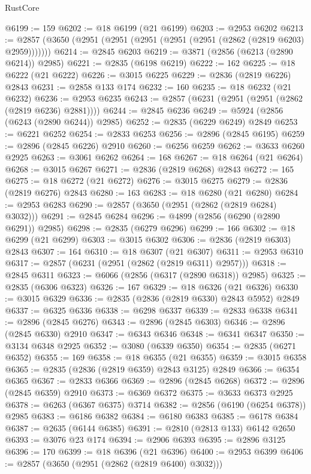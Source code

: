 \begin{lexlean}{RustCore}
\begin{coremodule}
@6199 := 159
@6202 := @18 @6199 (@21 @6199)
@6203 := @2953 @6202
@6213 := @2857 (@3650 (@2951 (@2951 (@2951 (@2951 (@2951 (@2862 (@2819 @6203) @2959)))))))
@6214 := @2845 @6203
@6219 := @3871 (@2856 (@6213 (@2890 @6214)) @2985)
@6221 := @2835 (@6198 @6219)
@6222 := 162
@6225 := @18 @6222 (@21 @6222)
@6226 := @3015 @6225
@6229 := @2836 (@2819 @6226) @2843
@6231 := @2858 @133 @174
@6232 := 160
@6235 := @18 @6232 (@21 @6232)
@6236 := @2953 @6235
@6243 := @2857 (@6231 (@2951 (@2951 (@2862 (@2819 @6236) @2881))))
@6244 := @2845 @6236
@6249 := @5924 (@2856 (@6243 (@2890 @6244)) @2985)
@6252 := @2835 (@6229 @6249) @2849
@6253 := @6221 @6252
@6254 := @2833 @6253
@6256 := @2896 (@2845 @6195)
@6259 := @2896 (@2845 @6226) @2910
@6260 := @6256 @6259
@6262 := @3633 @6260 @2925
@6263 := @3061 @6262
@6264 := 168
@6267 := @18 @6264 (@21 @6264)
@6268 := @3015 @6267
@6271 := @2836 (@2819 @6268) @2843
@6272 := 165
@6275 := @18 @6272 (@21 @6272)
@6276 := @3015 @6275
@6279 := @2836 (@2819 @6276) @2843
@6280 := 163
@6283 := @18 @6280 (@21 @6280)
@6284 := @2953 @6283
@6290 := @2857 (@3650 (@2951 (@2862 (@2819 @6284) @3032)))
@6291 := @2845 @6284
@6296 := @4899 (@2856 (@6290 (@2890 @6291)) @2985)
@6298 := @2835 (@6279 @6296)
@6299 := 166
@6302 := @18 @6299 (@21 @6299)
@6303 := @3015 @6302
@6306 := @2836 (@2819 @6303) @2843
@6307 := 164
@6310 := @18 @6307 (@21 @6307)
@6311 := @2953 @6310
@6317 := @2857 (@6231 (@2951 (@2862 (@2819 @6311) @2957)))
@6318 := @2845 @6311
@6323 := @6066 (@2856 (@6317 (@2890 @6318)) @2985)
@6325 := @2835 (@6306 @6323)
@6326 := 167
@6329 := @18 @6326 (@21 @6326)
@6330 := @3015 @6329
@6336 := @2835 (@2836 (@2819 @6330) @2843 @5952) @2849
@6337 := @6325 @6336
@6338 := @6298 @6337
@6339 := @2833 @6338
@6341 := @2896 (@2845 @6276)
@6343 := @2896 (@2845 @6303)
@6346 := @2896 (@2845 @6330) @2910
@6347 := @6343 @6346
@6348 := @6341 @6347
@6350 := @3134 @6348 @2925
@6352 := @3080 (@6339 @6350)
@6354 := @2835 (@6271 @6352)
@6355 := 169
@6358 := @18 @6355 (@21 @6355)
@6359 := @3015 @6358
@6365 := @2835 (@2836 (@2819 @6359) @2843 @3125) @2849
@6366 := @6354 @6365
@6367 := @2833 @6366
@6369 := @2896 (@2845 @6268)
@6372 := @2896 (@2845 @6359) @2910
@6373 := @6369 @6372
@6375 := @3633 @6373 @2925
@6378 := @6263 (@6367 @6375) @3714
@6382 := @2856 (@6190 (@6254 @6378)) @2985
@6383 := @6186 @6382
@6384 := @6180 @6383
@6385 := @6178 @6384
@6387 := @2635 (@6144 @6385)
@6391 := @2810 (@2813 @133) @6142 @2650
@6393 := @3076 @23 @174
@6394 := @2906 @6393
@6395 := @2896 @3125
@6396 := 170
@6399 := @18 @6396 (@21 @6396)
@6400 := @2953 @6399
@6406 := @2857 (@3650 (@2951 (@2862 (@2819 @6400) @3032)))

\end{coremodule}
\end{lexlean}
